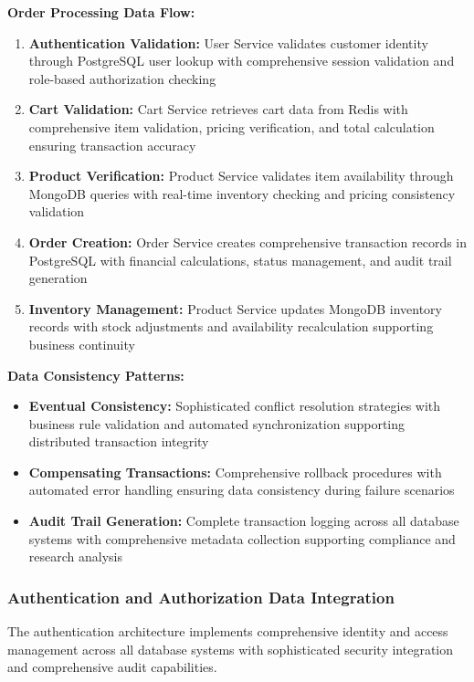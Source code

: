 \textbf{Order Processing Data Flow:}
\begin{enumerate}
\item \textbf{Authentication Validation:} User Service validates customer identity through PostgreSQL user lookup with comprehensive session validation and role-based authorization checking
\item \textbf{Cart Validation:} Cart Service retrieves cart data from Redis with comprehensive item validation, pricing verification, and total calculation ensuring transaction accuracy
\item \textbf{Product Verification:} Product Service validates item availability through MongoDB queries with real-time inventory checking and pricing consistency validation
\item \textbf{Order Creation:} Order Service creates comprehensive transaction records in PostgreSQL with financial calculations, status management, and audit trail generation
\item \textbf{Inventory Management:} Product Service updates MongoDB inventory records with stock adjustments and availability recalculation supporting business continuity
\end{enumerate}

\textbf{Data Consistency Patterns:}
\begin{itemize}
\item \textbf{Eventual Consistency:} Sophisticated conflict resolution strategies with business rule validation and automated synchronization supporting distributed transaction integrity
\item \textbf{Compensating Transactions:} Comprehensive rollback procedures with automated error handling ensuring data consistency during failure scenarios
\item \textbf{Audit Trail Generation:} Complete transaction logging across all database systems with comprehensive metadata collection supporting compliance and research analysis
\end{itemize}

\subsubsection{Authentication and Authorization Data Integration}

The authentication architecture implements comprehensive identity and access management across all database systems with sophisticated security integration and comprehensive audit capabilities.

